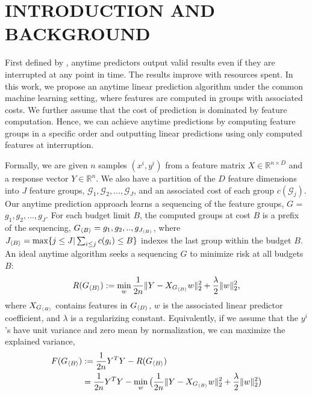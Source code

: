 \section{INTRODUCTION AND BACKGROUND}

First defined by \cite{anytime}, anytime predictors output 
valid results even if they are interrupted at any point in time. The results improve with resources spent. In this work, we propose an anytime linear prediction algorithm under the common 
machine learning setting, where features are computed in groups with associated costs. We further assume that the cost of 
prediction is dominated by feature computation. Hence, 
we can achieve anytime predictions by computing feature groups
in a specific order and outputting linear predictions 
using only computed features at interruption.

Formally, we are given $n$ samples $(x^i, y^i)$ from 
a feature matrix $X \in \mathbb{R}^{n \times D}$ and a response vector $Y \in \mathbb{R}^n$. We also have a partition of the
$D$ feature dimensions into $J$ feature groups, 
$\mathcal{G}_1, \mathcal{G}_2, ..., \mathcal{G}_J$, and 
an associated cost of each group $c(\mathcal{G}_j)$. Our anytime prediction approach learns a sequencing of the
feature groups, $G$ = $g_1, g_2,..., g_J$. 
For each budget limit $B$, the computed
groups at cost $B$ is a prefix of the sequencing, $G_{\langle B \rangle} = g_1, g_2,.., g_{J_{\langle B \rangle}}$, 
where 
$J_{\langle B \rangle} = \max \{ j\leq J | \sum _{i\leq j} c(g_i) \leq B \}$ indexes the last group within the budget $B$. 
An ideal anytime algorithm seeks a sequencing $G$ to minimize risk at all budgets $B$:
\begin{align}
\label{eq:risk}
R(G_{\langle B \rangle}) :=   \min _{w}
    \frac{1}{2n} \Vert Y - X_{{G_{\langle B \rangle}}} {w} \Vert_2^2 + \frac{\lambda}{2} \Vert w\Vert_2^2,
\end{align}
where $X_{G_{\langle B \rangle}}$ contains features in $G_{\langle B \rangle}$, $w$ is the associated linear predictor coefficient, and $\lambda$ is a regularizing constant.
Equivalently, if we assume that the $y^i$'s have unit variance and zero mean by normalization, we can maximize the explained variance, 
\begin{align}    
\label{eq:exp-var}
    F(G_{\langle B \rangle}) &:= \frac{1}{2n} Y^TY - R(G_{\langle B \rangle}) \\
     &=  \frac{1}{2n} Y^TY - 
     \min _{w} \big(
    \frac{1}{2n} \Vert Y - X_{{G_{\langle B \rangle}}} {w} \Vert_2^2 + \frac{\lambda}{2} \Vert w\Vert_2^2 \big)
\end{align}

